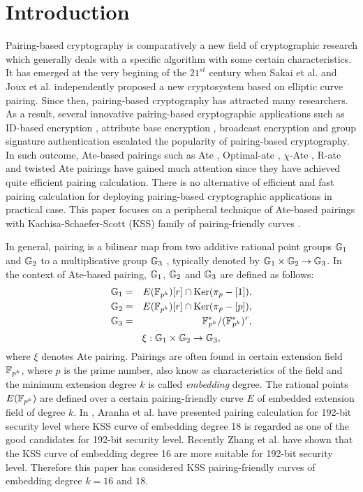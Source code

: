 \section{Introduction}
Pairing-based cryptography is comparatively a new field of cryptographic research which generally deals with a specific algorithm with  some certain characteristics.
It has emerged at the very begining of the $21^{st}$ century when Sakai et al. \cite{sakai} and Joux et al. \cite{joux} independently proposed a new cryptosystem based on elliptic curve pairing.
Since then, pairing-based cryptography has attracted many researchers. 
As a result,  several innovative pairing-based cryptographic applications such as ID-based encryption \cite{sakai}, attribute base encryption \cite{abe_amit}, broadcast encryption \cite{boradcast} and group signature authentication \cite{group_sign_1} escalated the popularity of pairing-based cryptography.
In such outcome, Ate-based pairings such as Ate \cite{ate}, Optimal-ate \cite{op_ate_p}, $\chi$-Ate \cite{chibasedBN}, R-ate \cite{r_ate} and  twisted Ate  \cite{twisted_ate} pairings have gained much attention since they have achieved quite efficient pairing calculation. 
There is no alternative of efficient and fast pairing calculation for deploying pairing-based cryptographic applications in practical case. 
This paper focuses on a peripheral technique of Ate-based pairings with Kachisa-Schaefer-Scott (KSS) family of pairing-friendly curves \cite{kss}. 

In general, pairing is a bilinear map from two additive rational point groups ${\mathbb{G}}_{1}$ and ${\mathbb{G}}_{2}$ to a multiplicative group ${\mathbb{G}}_{3}$ \cite{Silverman}, typically denoted by ${\mathbb{G}}_{1} \times {\mathbb{G}}_{2} \rightarrow {\mathbb{G}}_{3}$.
In the context of Ate-based pairing, ${\mathbb{G}}_{1}$, ${\mathbb{G}}_{2}$ and ${\mathbb{G}}_{3}$ are defined as follows:
\begin{eqnarray}\label{eq:g_1}
{\mathbb{G}}_{1} & = &  E({\mathbb{F}}_{p^{k}}) [r] \cap \text{Ker}(\pi_p - [1]), \nonumber \\
{\mathbb{G}}_{2} & = &  E({\mathbb{F}}_{p^{k}}) [r] \cap \text{Ker}(\pi_p - [p]), \nonumber \\
{\mathbb{G}}_{3} & = & {{\mathbb{F}}^{\ast}}_{\!\!\!p^{k}}/({{\mathbb{F}}^{\ast}}_{\!\!\!p^{k}})^r, \nonumber
\end{eqnarray}
\begin{equation}
\xi : {\mathbb{G}}_{1} \times {\mathbb{G}}_{2} \rightarrow {\mathbb{G}}_{3},  \nonumber
\end{equation}
where $\xi$ denotes Ate pairing. 
Pairings are often found in certain extension field $\mathbb{F}_{p^k}$, where $p$ is the prime number, also know as characteristics of the field and the minimum extension degree $k$ is called \textit{embedding} degree. 
The rational points $E(\mathbb{F}_{p^k})$ are defined over a certain pairing-friendly curve $E$ of embedded extension field of degree $k$. 
In \cite{aranha}, Aranha et al. have presented pairing calculation for 192-bit security level where  KSS curve of embedding degree 18 is regarded as one of the good candidates for 192-bit security level.
Recently Zhang et al. \cite{kss_zan} have shown that the KSS curve of embedding degree 16 are more suitable for 192-bit security level.
Therefore this paper has considered KSS pairing-friendly curves of embedding degree $k=16$ and $18$.

